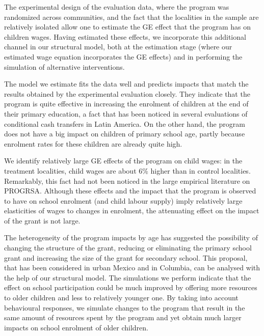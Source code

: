 \documentclass{handoutForSolutions}
\begin{document}
The experimental design of the evaluation data, where the program was randomized across communities, and the fact that the localities in the sample are relatively isolated allow one to estimate the GE effect that the program has on children wages. Having estimated these effects, we incorporate this additional channel in our structural model, both at the estimation stage (where our estimated wage equation incorporates the GE effects) and in performing the simulation of alternative interventions.

The model we estimate fits the data well and predicts impacts that match the results obtained by the experimental evaluation closely. They indicate that the program is quite effective in increasing the enrolment of children at the end of their primary education, a fact that has been noticed in several evaluations of conditional cash transfers in Latin America. On the other hand, the program does not have a big impact on children of primary school age, partly because enrolment rates for these children are already quite high.

We identify relatively large GE effects of the program on child wages: in the treatment localities, child wages are about 6\% higher than in control localities. Remarkably, this fact had not been noticed in the large empirical literature on PROGRSA. Although these effects and the impact that the program is observed to have on school enrolment (and child labour supply) imply relatively large elasticities of wages to changes in enrolment, the attenuating effect on the impact of the grant is not large.

The heterogeneity of the program impacts by age has suggested the possibility of changing the structure of the grant, reducing or eliminating the primary school grant and increasing the size of the grant for secondary school. This proposal, that has been considered in urban Mexico and in Columbia, can be analysed with the help of our structural model. The simulations we perform indicate that the effect on school participation could be much improved by offering more resources to older children and less to relatively younger one. By taking into account behavioural responses, we simulate changes to the program that result in the same amount of resources spent by the program and yet obtain much larger impacts on school enrolment of older children.
\end{document}
